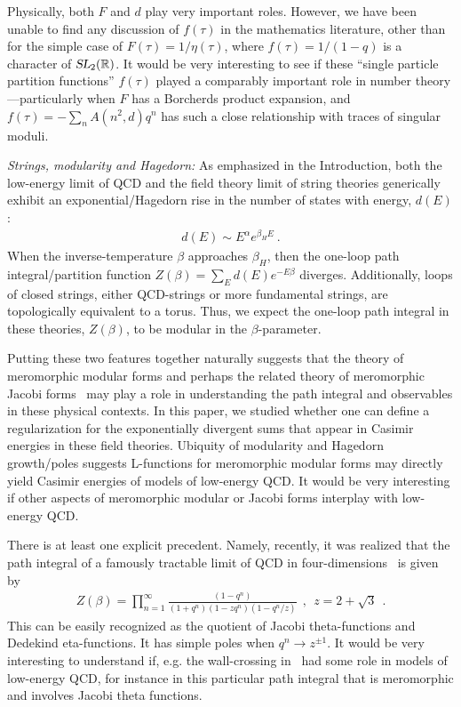 \documentclass[11pt,a4paper]{article}
\def\R{\mathbb{R}}
\newcommand{\SL}{\operatorname{\textsl{SL}}}	 	%
\begin{document}
Physically, both $F$ and $d$ play very important roles. However, we have been unable to find any discussion of $f(\tau)$ in the mathematics literature, other than for the simple case of $F(\tau) = 1/\eta(\tau)$, where $f(\tau) = 1/(1-q)$ is a character of $\SL_2(\R)$. It would be very interesting to see if these ``single particle partition functions'' $f(\tau)$ played a comparably important role in number theory---particularly when $F$ has a Borcherds product expansion, and $f(\tau) = -\sum_n A(n^2,d) q^n$ has such a close relationship with traces of singular moduli. 

{\em Strings, modularity and Hagedorn:} As emphasized in the Introduction, both the low-energy limit of QCD and the field theory limit of string theories generically exhibit an exponential/Hagedorn rise in the number of states with energy, $d(E)$:
\begin{align}
d(E) \sim E^{\alpha} e^{\beta_H E}~.
\end{align} 
When the inverse-temperature $\beta$ approaches $\beta_H$, then the one-loop path integral/partition function $Z(\beta) = \sum_E d(E) e^{-E \beta}$ diverges. Additionally, loops of closed strings, either QCD-strings or more fundamental strings, are topologically equivalent to a torus. Thus, we expect the one-loop path integral in these theories, $Z(\beta)$, to be modular in the $\beta$-parameter. 

Putting these two features together naturally suggests that the theory of meromorphic modular forms and perhaps the related theory of meromorphic Jacobi forms~\cite{24-DMZ} may play a role in understanding the path integral and observables in these physical contexts. In this paper, we studied whether one can define a regularization for the exponentially divergent sums that appear in Casimir energies in these field theories. Ubiquity of modularity and Hagedorn growth/poles suggests L-functions for meromorphic modular forms may directly yield Casimir energies of models of low-energy QCD. It would be very interesting if other aspects of meromorphic modular or Jacobi forms interplay with low-energy QCD. 

There is at least one explicit precedent. Namely, recently, it was realized that the path integral of a famously tractable limit of QCD in four-dimensions~\cite{09-S1S3} is given by~\cite{10-2d4d1, 11-2d4d2}
\begin{align}
Z(\beta) = \prod_{n =1 }^{\infty} \frac{(1-q^n)}{(1+q^n)(1-z q^n) (1-q^n/z)} ~~,~~z = 2 + \sqrt{3}~~.
\end{align}
This can be easily recognized as the quotient of Jacobi theta-functions and Dedekind eta-functions. It has simple poles when $q^n \to z^{\pm 1}$. It would be very interesting to understand if, e.g. the wall-crossing in~\cite{24-DMZ} had some role in models of low-energy QCD, for instance in this particular path integral that is meromorphic and involves Jacobi theta functions.
\end{document}
